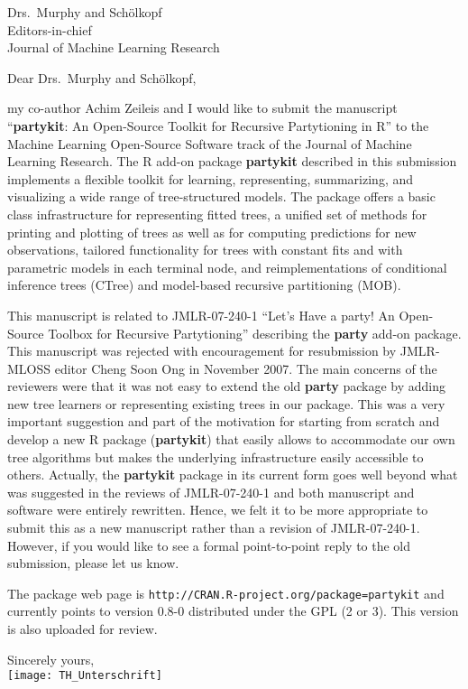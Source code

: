 \documentclass[ngerman,uzh]{scrlttr2}
\begin{document}

\begin{letter}{
Drs.~Murphy and Schölkopf \\
Editors-in-chief \\
Journal of Machine Learning Research}

\subject{JMLR-MLOSS submission}

\opening{Dear Drs.~Murphy and Schölkopf,}

my co-author Achim Zeileis and I would like to submit the manuscript
``\textbf{partykit}: An Open-Source Toolkit for Recursive Partytioning in R'' to the
Machine Learning Open-Source Software track of the Journal of Machine
Learning Research.
The \textsf{R} add-on package \textbf{partykit} described in this submission implements a
flexible toolkit for learning, representing, summarizing, and visualizing a
wide range of tree-structured models.  The package offers a basic class
infrastructure for representing fitted trees, a unified set of methods for
printing and plotting of trees as well as for computing predictions for new
observations, tailored functionality for trees with constant fits and with
parametric models in each terminal node, and reimplementations of conditional
inference trees (CTree) and model-based recursive partitioning (MOB).

This manuscript is related to JMLR-07-240-1 ``Let's Have a party! An
Open-Source Toolbox for Recursive Partytioning'' describing the
\textbf{party} add-on
package.  This manuscript was rejected with encouragement for resubmission by
JMLR-MLOSS editor Cheng Soon Ong in November 2007.  The main concerns of the
reviewers were that it was not easy to extend the old \textbf{party} package by adding
new tree learners or representing existing trees in our package.  This was
a very important suggestion and part of the motivation for starting from
scratch and develop a new R package (\textbf{partykit}) that easily allows to
accommodate our own tree algorithms but makes the underlying infrastructure
easily accessible to others. Actually, the \textbf{partykit} package in its current
form goes well beyond what was suggested in the reviews of JMLR-07-240-1
and both manuscript and software were entirely rewritten. Hence, we felt it
to be more appropriate to submit this as a new manuscript rather than a
revision of JMLR-07-240-1.  However, if you would like to see a formal
point-to-point reply to the old submission, please let us know.

The package web page is \texttt{http://CRAN.R-project.org/package=partykit}
and currently points to version 0.8-0 distributed under the GPL (2 or 3).
This version is also uploaded for review. 

Sincerely yours, \\
\texttt{[image: TH\_Unterschrift]}

\end{letter}
\end{document}
